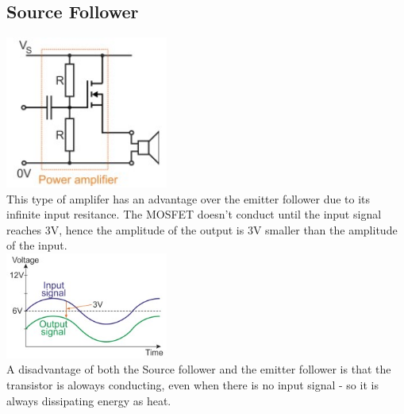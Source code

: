 \documentclass[a4paper, 11pt, twocolumn]{article}
\begin{document}
    \subsection{Source Follower}
    \includegraphics[width=0.4\textwidth]{sourceFollower.jpg}\\
    This type of amplifer has an advantage over the emitter follower due to its infinite input resitance.
    The MOSFET doesn't conduct until the input signal reaches 3V, hence the amplitude of the output is 3V smaller than the amplitude of the input. \\
    \includegraphics[width=0.4\textwidth]{sourceFollowerOut.jpg}\\
    A disadvantage of both the Source follower and the emitter follower is that the transistor is aloways conducting, even when there is no input signal - so it is always dissipating energy as heat.
\end{document}

